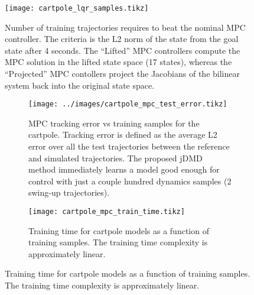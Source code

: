 \documentclass{article}
\begin{document}
\begin{figure}
  \centering
  \texttt{[image: cartpole\_lqr\_samples.tikz]}
  \caption{Number of training trajectories requires to beat the nominal MPC controller.
    The criteria is the L2 norm of the state from the goal state after 4 seconds.
    The ``Lifted'' MPC controllers compute the MPC solution in the lifted state space 
    (17 states), whereas the ``Projected'' MPC contollers project the Jacobians of the 
    bilinear system back into the original state space.
  }
  \label{fig:cartpole_lqr_samples}
\end{figure}

\begin{figure}[t]
  \centering
  \begin{subfigure}[t]{0.48\textwidth}
    \raggedleft
    \texttt{[image: ../images/cartpole\_mpc\_test\_error.tikz]}
    \caption{MPC tracking error vs training samples for the cartpole. Tracking error is
    defined as the average L2 error over all the test trajectories between the reference and
    simulated trajectories. The proposed jDMD method immediately learns a model good enough
    for control with just a couple hundred dynamics samples (2 swing-up trajectories).}
    \label{fig:cartpole_mpc_test_error}
  \end{subfigure}
  \hfill
  \begin{subfigure}[t]{0.48\textwidth}
    \raggedright
    \texttt{[image: cartpole\_mpc\_train\_time.tikz]}
    \caption{Training time for cartpole models as a function of training samples. The 
    training time complexity is approximately linear.}
    \label{fig:cartpole_train_time}
  \end{subfigure}
\end{figure}
\end{document}

